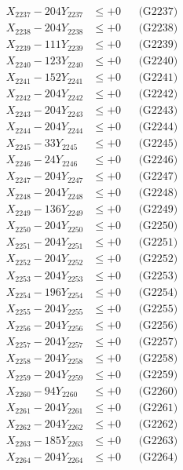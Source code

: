 \documentclass[a4paper,10pt]{article}
\begin{document}
{\begin{align}
X_{2237} - 204Y_{2237} &\leq +0 && \text{(G2237)} \\
X_{2238} - 204Y_{2238} &\leq +0 && \text{(G2238)} \\
X_{2239} - 111Y_{2239} &\leq +0 && \text{(G2239)} \\
X_{2240} - 123Y_{2240} &\leq +0 && \text{(G2240)} \\
\allowbreak
X_{2241} - 152Y_{2241} &\leq +0 && \text{(G2241)} \\
X_{2242} - 204Y_{2242} &\leq +0 && \text{(G2242)} \\
X_{2243} - 204Y_{2243} &\leq +0 && \text{(G2243)} \\
X_{2244} - 204Y_{2244} &\leq +0 && \text{(G2244)} \\
X_{2245} - 33Y_{2245} &\leq +0 && \text{(G2245)} \\
X_{2246} - 24Y_{2246} &\leq +0 && \text{(G2246)} \\
X_{2247} - 204Y_{2247} &\leq +0 && \text{(G2247)} \\
X_{2248} - 204Y_{2248} &\leq +0 && \text{(G2248)} \\
X_{2249} - 136Y_{2249} &\leq +0 && \text{(G2249)} \\
X_{2250} - 204Y_{2250} &\leq +0 && \text{(G2250)} \\
\allowbreak
X_{2251} - 204Y_{2251} &\leq +0 && \text{(G2251)} \\
X_{2252} - 204Y_{2252} &\leq +0 && \text{(G2252)} \\
X_{2253} - 204Y_{2253} &\leq +0 && \text{(G2253)} \\
X_{2254} - 196Y_{2254} &\leq +0 && \text{(G2254)} \\
X_{2255} - 204Y_{2255} &\leq +0 && \text{(G2255)} \\
X_{2256} - 204Y_{2256} &\leq +0 && \text{(G2256)} \\
X_{2257} - 204Y_{2257} &\leq +0 && \text{(G2257)} \\
X_{2258} - 204Y_{2258} &\leq +0 && \text{(G2258)} \\
X_{2259} - 204Y_{2259} &\leq +0 && \text{(G2259)} \\
X_{2260} - 94Y_{2260} &\leq +0 && \text{(G2260)} \\
\allowbreak
X_{2261} - 204Y_{2261} &\leq +0 && \text{(G2261)} \\
X_{2262} - 204Y_{2262} &\leq +0 && \text{(G2262)} \\
X_{2263} - 185Y_{2263} &\leq +0 && \text{(G2263)} \\
X_{2264} - 204Y_{2264} &\leq +0 && \text{(G2264)} \\

\end{align}}
\end{document}

